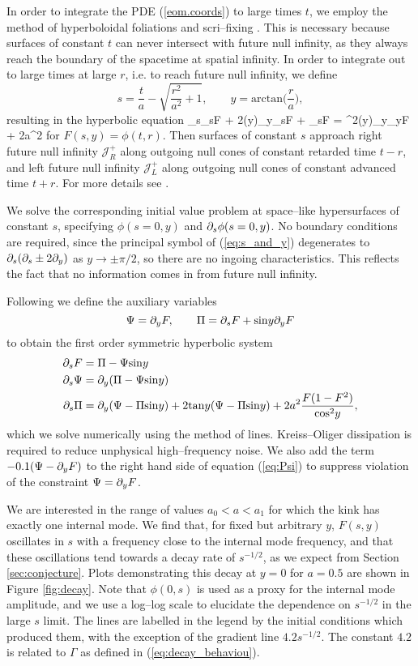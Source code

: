 In order to integrate the PDE (\ref{eom.coords}) to large times $t$, we employ the method of hyperboloidal foliations and scri--fixing \cite{hyp_foliations}. This is necessary because surfaces of constant $t$ can never intersect with future null infinity, as they always reach the boundary of the spacetime at spatial infinity. In order to integrate out to large times at large $r$, i.e. to reach future null infinity, we define
\[
s = \frac{t}{a} - \sqrt{\frac{r^2}{a^2}+1}, \qquad y=\mathrm{arctan}\Big(\frac{r}{a}\Big),
\]
resulting in the hyperbolic equation
\be
\label{eq:s_and_y}
\p_s\p_sF + 2(y)\p_y\p_sF + \p_sF = ^2(y)\p_y\p_yF + 2a^2
\ee
for $F(s,y)=\phi(t,r)$. Then surfaces of constant $s$ approach right future null infinity $\mathcal{J}^+_R$ along outgoing null cones of constant retarded time $t-r$, and left future null infinity $\mathcal{J}^+_L$ along outgoing null cones of constant advanced time $t+r$. For more details see \cite{SG,hyp_foliations}.

We solve the corresponding initial value problem at space--like hypersurfaces of constant $s$, specifying $\phi(s=0,y)$ and $\partial_s\phi(s=0,y)$. No boundary conditions are required, since the principal symbol of (\ref{eq:s_and_y}) degenerates to $\partial_s(\partial_s\pm 2\partial_y)$ as $y\rightarrow\pm \pi/2$, so there are no ingoing characteristics. This reflects the fact that no information comes in from future null infinity.

Following \cite{wavemaps, sym_hyp} we define the auxiliary variables
\[
\Psi = \partial_yF, \qquad \Pi = \partial_sF + \mathrm{sin}y\partial_yF
\]
to obtain the first order symmetric hyperbolic system
\begin{align}
\partial_sF &= \Pi - \Psi\mathrm{sin}y \\
\label{eq:Psi} \partial_s\Psi &= \partial_y(\Pi-\Psi\mathrm{sin}y) \\
\partial_s\Pi &= \partial_y(\Psi-\Pi\mathrm{sin}y) + 2\mathrm{tan}y(\Psi-\Pi\mathrm{sin}y) + 2a^2\frac{F(1-F^2)}{\mathrm{cos}^2y},
\end{align}
which we solve numerically using the method of lines. Kreiss--Oliger dissipation is required to reduce unphysical high--frequency noise. We also add the term $-0.1(\Psi-\partial_yF)$ to the right hand side of equation (\ref{eq:Psi}) to suppress violation of the constraint $\Psi=\partial_yF$.

We are interested in the range of values $a_0<a<a_1$ for which the kink has exactly one internal mode. We find that, for fixed but arbitrary $y$, $F(s,y)$ oscillates in $s$ with a frequency close to the internal mode frequency, and that these oscillations tend towards a decay rate of $s^{-1/2}$, as we expect from Section \ref{sec:conjecture}. Plots demonstrating this decay at $y=0$ for $a=0.5$ are shown in Figure \ref{fig:decay}. Note that $\phi(0,s)$ is used as a proxy for the internal mode amplitude, and we use a log--log scale to elucidate the dependence on $s^{-1/2}$ in the large $s$ limit. The lines are labelled in the legend by the initial conditions which produced them, with the exception of the gradient line $4.2s^{-1/2}$. The constant $4.2$ is related to $\Gamma$ as defined in (\ref{eq:decay_behaviou}).

